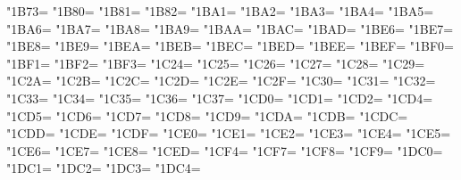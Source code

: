 \XeTeXcharclass"1B73=\KclassCM
\XeTeXcharclass"1B80=\KclassCM
\XeTeXcharclass"1B81=\KclassCM
\XeTeXcharclass"1B82=\KclassCM
\XeTeXcharclass"1BA1=\KclassCM
\XeTeXcharclass"1BA2=\KclassCM
\XeTeXcharclass"1BA3=\KclassCM
\XeTeXcharclass"1BA4=\KclassCM
\XeTeXcharclass"1BA5=\KclassCM
\XeTeXcharclass"1BA6=\KclassCM
\XeTeXcharclass"1BA7=\KclassCM
\XeTeXcharclass"1BA8=\KclassCM
\XeTeXcharclass"1BA9=\KclassCM
\XeTeXcharclass"1BAA=\KclassCM
\XeTeXcharclass"1BAC=\KclassCM
\XeTeXcharclass"1BAD=\KclassCM
\XeTeXcharclass"1BE6=\KclassCM
\XeTeXcharclass"1BE7=\KclassCM
\XeTeXcharclass"1BE8=\KclassCM
\XeTeXcharclass"1BE9=\KclassCM
\XeTeXcharclass"1BEA=\KclassCM
\XeTeXcharclass"1BEB=\KclassCM
\XeTeXcharclass"1BEC=\KclassCM
\XeTeXcharclass"1BED=\KclassCM
\XeTeXcharclass"1BEE=\KclassCM
\XeTeXcharclass"1BEF=\KclassCM
\XeTeXcharclass"1BF0=\KclassCM
\XeTeXcharclass"1BF1=\KclassCM
\XeTeXcharclass"1BF2=\KclassCM
\XeTeXcharclass"1BF3=\KclassCM
\XeTeXcharclass"1C24=\KclassCM
\XeTeXcharclass"1C25=\KclassCM
\XeTeXcharclass"1C26=\KclassCM
\XeTeXcharclass"1C27=\KclassCM
\XeTeXcharclass"1C28=\KclassCM
\XeTeXcharclass"1C29=\KclassCM
\XeTeXcharclass"1C2A=\KclassCM
\XeTeXcharclass"1C2B=\KclassCM
\XeTeXcharclass"1C2C=\KclassCM
\XeTeXcharclass"1C2D=\KclassCM
\XeTeXcharclass"1C2E=\KclassCM
\XeTeXcharclass"1C2F=\KclassCM
\XeTeXcharclass"1C30=\KclassCM
\XeTeXcharclass"1C31=\KclassCM
\XeTeXcharclass"1C32=\KclassCM
\XeTeXcharclass"1C33=\KclassCM
\XeTeXcharclass"1C34=\KclassCM
\XeTeXcharclass"1C35=\KclassCM
\XeTeXcharclass"1C36=\KclassCM
\XeTeXcharclass"1C37=\KclassCM
\XeTeXcharclass"1CD0=\KclassCM
\XeTeXcharclass"1CD1=\KclassCM
\XeTeXcharclass"1CD2=\KclassCM
\XeTeXcharclass"1CD4=\KclassCM
\XeTeXcharclass"1CD5=\KclassCM
\XeTeXcharclass"1CD6=\KclassCM
\XeTeXcharclass"1CD7=\KclassCM
\XeTeXcharclass"1CD8=\KclassCM
\XeTeXcharclass"1CD9=\KclassCM
\XeTeXcharclass"1CDA=\KclassCM
\XeTeXcharclass"1CDB=\KclassCM
\XeTeXcharclass"1CDC=\KclassCM
\XeTeXcharclass"1CDD=\KclassCM
\XeTeXcharclass"1CDE=\KclassCM
\XeTeXcharclass"1CDF=\KclassCM
\XeTeXcharclass"1CE0=\KclassCM
\XeTeXcharclass"1CE1=\KclassCM
\XeTeXcharclass"1CE2=\KclassCM
\XeTeXcharclass"1CE3=\KclassCM
\XeTeXcharclass"1CE4=\KclassCM
\XeTeXcharclass"1CE5=\KclassCM
\XeTeXcharclass"1CE6=\KclassCM
\XeTeXcharclass"1CE7=\KclassCM
\XeTeXcharclass"1CE8=\KclassCM
\XeTeXcharclass"1CED=\KclassCM
\XeTeXcharclass"1CF4=\KclassCM
\XeTeXcharclass"1CF7=\KclassCM
\XeTeXcharclass"1CF8=\KclassCM
\XeTeXcharclass"1CF9=\KclassCM
\XeTeXcharclass"1DC0=\KclassCM
\XeTeXcharclass"1DC1=\KclassCM
\XeTeXcharclass"1DC2=\KclassCM
\XeTeXcharclass"1DC3=\KclassCM
\XeTeXcharclass"1DC4=\KclassCM
